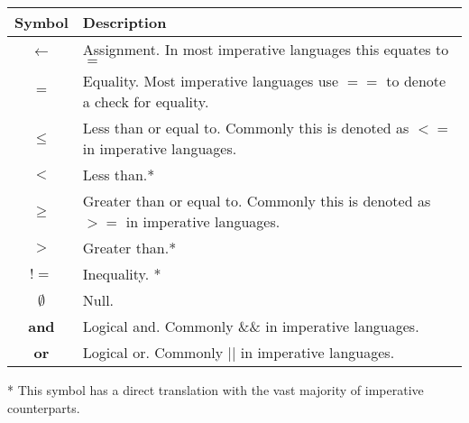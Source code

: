 \documentclass[10pt,oneside,a4paper]{report}
\begin{document}
\begin{tabular}[t]{|c|l|}
\hline
\textbf{Symbol} & \textbf{Description} \\
\hline
$\leftarrow$ & Assignment. In most imperative languages this equates to $=$ \\
\hline
$=$ & Equality. Most imperative languages use $==$ to denote a check for equality. \\
\hline
$\leq$ & Less than or equal to. Commonly this is denoted as $<=$ in imperative languages. \\
\hline
$<$ & Less than.* \\
\hline
$\geq$ & Greater than or equal to. Commonly this is denoted as $>=$ in imperative languages. \\
\hline
$>$ & Greater than.* \\
\hline
$!=$ & Inequality. * \\
\hline
$\emptyset$ & Null. \\
\hline
\textbf{and} & Logical and. Commonly \&\& in imperative languages. \\
\hline
\textbf{or} & Logical or. Commonly || in imperative languages. \\ %
\hline
\end{tabular}

* This symbol has a direct translation with the vast majority of imperative counterparts.
\end{document}
